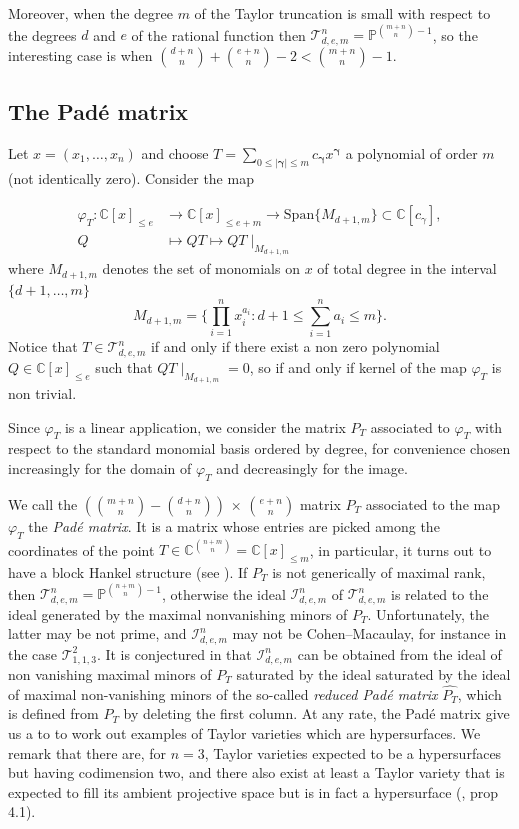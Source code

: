 \documentclass[letterpaper,11pt]{amsart}
\theoremstyle{plain}
\theoremstyle{definition}
\newcommand{\enm}[1]{\ensuremath{#1}}          %
\newcommand{\tv}{\mathcal{T}}
\newcommand{\PP}{\enm{\mathbb{P}}}
\newcommand{\C}{\mathbb{C}}
\begin{document}
Moreover, when the degree $m$ of the Taylor truncation is small with respect to the degrees $d$ and $e$ of the rational function then $\tv^n_{d,e,m}=\PP^{{m+n \choose n}-1}$, so the interesting case is when ${d+n \choose n}+{e+n \choose n}-2<{m+n \choose n}-1$.


\subsection{The Pad\'e matrix}\label{subsection: pade marix} 

Let $x=(x_1,\dots,x_n)$ and choose $T=\sum_{0\leq |\bm{\gamma}| \leq m}c_{\bm{\gamma}}x^{\bm{\gamma}}$  a  polynomial of order $m$ (not identically zero).  Consider the map 

\begin{align}\label{phi}
\varphi_T: \C[x]_{\leq e} &\to \C[x]_{\leq e+m} \to \mathrm{Span}\{M_{d+1,m}\}\subset\C[c_{\gamma}], \\
Q &\mapsto QT \mapsto QT\mid_{M_{d+1,m}}\nonumber
\end{align} where $M_{d+1,m}$ denotes the set of monomials on $x$ of total degree in the interval  $\{d+1,\dots,m\}$ 
 $$
 M_{d+1,m}=\bigg\{\prod_{i=1}^nx_{i}^{a_{i}} : d+1 \leq \sum_{i=1}^na_{i} \leq m\bigg\}.
 $$ 
Notice that $T\in \tv^n_{d,e,m}$ if and only if there exist a non zero polynomial $Q \in \C[x]_{\leq e}$ such that   $QT\mid_{M_{d+1,m}}=0$, so if and only if  kernel of the map $\varphi_T$ is non trivial.

Since $\varphi_T$ is a linear application, we consider the matrix $P_T$ associated to $\varphi_T$  with respect to the standard monomial basis ordered by degree, for convenience chosen increasingly  for the domain of $\varphi_T$ and decreasingly for the image.

We call the $\scriptstyle{\left({m+n \choose n}-{d+n \choose n}\right)\,\times\, {e+n \choose n}}$ matrix $P_T$ associated to the map $\varphi_T$ the \emph{Pad\'e matrix}. It is a matrix whose entries are picked among the coordinates of the point $T\in \mathbb{C}^{n+m \choose n}=\mathbb{C}[x]_{\leq m}$,
in particular, it turns out to have a block  
Hankel structure (see \cite{TV23}).
If $P_T$ is not generically of maximal rank, then $\tv^n_{d,e,m}=\PP^{{n+m \choose n}-1}$, otherwise the ideal $\mathcal{I}^n_{d,e,m}$ of $\tv^n_{d,e,m}$ is related to the ideal generated by the maximal nonvanishing minors of $P_T$. Unfortunately, the latter may be not prime, and $\mathcal{I}^n_{d,e,m}$ may not be Cohen--Macaulay, for instance in the case $\tv^2_{1,1,3}$. It is conjectured in  \cite{TV23} that $\mathcal{I}^n_{d,e,m}$ can be obtained from the ideal of non vanishing maximal minors of $P_T$ saturated by the ideal saturated by the
ideal of maximal non-vanishing minors of the so-called  \emph{reduced Pad\'e matrix} $\hat{P_T}$, which  is defined from $P_T$ by deleting the first column.
 At any rate, the Pad\'e matrix give us a to  to work out examples of Taylor varieties which are hypersurfaces. We remark that there are, for $n=3$,  Taylor varieties  expected to be a hypersurfaces but having codimension two, and there also exist  at least a Taylor variety that is expected to fill its ambient projective space but is in fact a hypersurface (\cite{TV23}, prop 4.1).  
\end{document}

